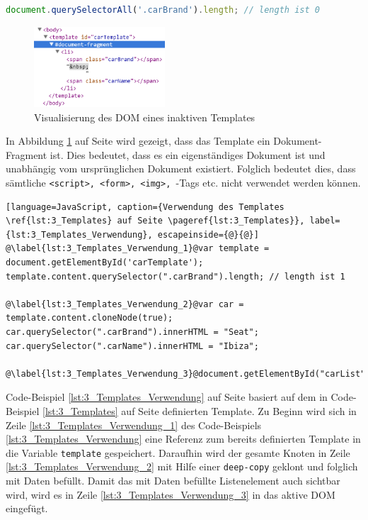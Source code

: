\begin{lstlisting}[language=JavaScript, caption={Beispiel-Selektor eines Elements in einem Template, das nicht aktiven DOM ist}, label={lst:3_Selector_Example}]
  document.querySelectorAll('.carBrand').length; // length ist 0
\end{lstlisting}

\begin{figure}[h]
\centering
\includegraphics[height=3.0cm]{images/document_fragment.png}
\caption[
Visualisierung des DOM eines inaktiven Templates, Urldate: 04.2014
\newline
\small\texttt{\url{http://www.prevent-default.com/wp-content/uploads/2013/04/document-fragment-300x132.png}}
]{Visualisierung des DOM eines inaktiven Templates}
\label{fig:3_inactive_Template_DOM}
\end{figure}

In Abbildung \ref{fig:3_inactive_Template_DOM} auf Seite \pageref{fig:3_inactive_Template_DOM} wird gezeigt, dass das Template ein Dokument-Fragment ist. Dies bedeutet, dass es ein eigenständiges Dokument ist und unabhängig vom ursprünglichen Dokument existiert. Folglich bedeutet dies, dass sämtliche \lstinline|<script>, <form>, <img>, |-Tags etc. nicht verwendet werden können.

\begin{lstlisting}[language=JavaScript, caption={Verwendung des Templates \ref{lst:3_Templates} auf Seite \pageref{lst:3_Templates}}, label={lst:3_Templates_Verwendung}, escapeinside={@}{@}]
@\label{lst:3_Templates_Verwendung_1}@var template = document.getElementById('carTemplate');
template.content.querySelector(".carBrand").length; // length ist 1

@\label{lst:3_Templates_Verwendung_2}@var car = template.content.cloneNode(true);
car.querySelector(".carBrand").innerHTML = "Seat";
car.querySelector(".carName").innerHTML = "Ibiza";

@\label{lst:3_Templates_Verwendung_3}@document.getElementById("carList").appendChild(car);
\end{lstlisting}

Code-Beispiel \ref{lst:3_Templates_Verwendung} auf Seite \pageref{lst:3_Templates_Verwendung} basiert auf dem in Code-Beispiel \ref{lst:3_Templates} auf Seite \pageref{lst:3_Templates} definierten Template. Zu Beginn wird sich in Zeile \ref{lst:3_Templates_Verwendung_1} des Code-Beispiels \ref{lst:3_Templates_Verwendung} eine Referenz zum bereits definierten Template in die Variable \lstinline|template| gespeichert. Daraufhin wird der gesamte Knoten in Zeile \ref{lst:3_Templates_Verwendung_2} mit Hilfe einer \lstinline|deep-copy| geklont und folglich mit Daten befüllt. Damit das mit Daten befüllte Listenelement auch sichtbar wird, wird es in Zeile \ref{lst:3_Templates_Verwendung_3} in das aktive DOM eingefügt.
